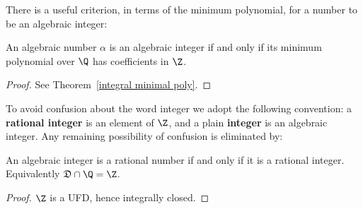 There is a useful criterion, in terms of the minimum polynomial, for a
number to be an algebraic integer:
\begin{lemma}\label{alg number int iff}
An algebraic number $\alpha$ is an algebraic integer if and only if its minimum polynomial over $\Q$ has coefficients in $\Z$.
\end{lemma}
\begin{proof}
See Theorem~\ref{integral minimal poly}.
\end{proof}
To avoid confusion about the word integer we adopt the following convention: a \textbf{rational integer} is an element of $\Z$, and a plain \textbf{integer} is an algebraic integer. Any remaining possibility of confusion is
eliminated by:
\begin{lemma}
An algebraic integer is a rational number if and only if it is a rational integer. Equivalently $\mathfrak{D}\cap\Q=\Z$.
\end{lemma}
\begin{proof}
$\Z$ is a UFD, hence integrally closed.
\end{proof}
